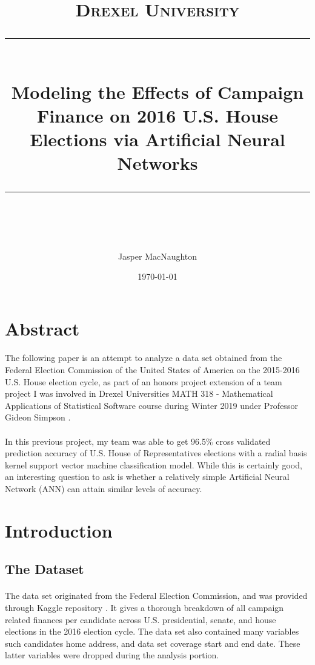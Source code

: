 \documentclass[11pt]{scrartcl} %
\title{	
	\normalfont\normalsize
	\textsc{Drexel University}\\ %
	\vspace{25pt} %
	\rule{\linewidth}{0.5pt}\\ %
	\vspace{20pt} %
	{\huge Modeling the Effects of Campaign Finance on 2016 U.S. House Elections via Artificial Neural Networks}\\ %
	\vspace{12pt} %
	\rule{\linewidth}{2pt}\\ %
	\vspace{12pt} %
}
\author{\LARGE Jasper MacNaughton} %
\date{\normalsize\today} %
\begin{document}
\maketitle %

\section{Abstract}
\paragraph{}
The following paper is an attempt to analyze a data set obtained from the Federal Election Commission of the United States of America on the 2015-2016 U.S. House election cycle, as part of an honors project extension of a team project I was involved in Drexel Universities MATH 318 - Mathematical Applications of Statistical Software course during Winter 2019 under Professor Gideon Simpson \cite{previouspaper}. 

\paragraph{}
In this previous project, my team was able to get 96.5\% cross validated prediction accuracy of U.S. House of Representatives elections with a radial basis kernel support vector machine classification model. While this is certainly good, an interesting question to ask is whether a relatively simple Artificial Neural Network (ANN) can attain similar levels of accuracy.

\section{Introduction}
\subsection{The Dataset}
\paragraph{}
The data set originated from the Federal Election Commission, and was provided through Kaggle repository \cite{kagglerepository}. It gives a thorough breakdown of all campaign related finances per candidate across U.S. presidential, senate, and house elections in the 2016 election cycle. The data set also contained many variables such candidates home address, and data set coverage start and end date. These latter variables were dropped during the analysis portion.
\end{document}
